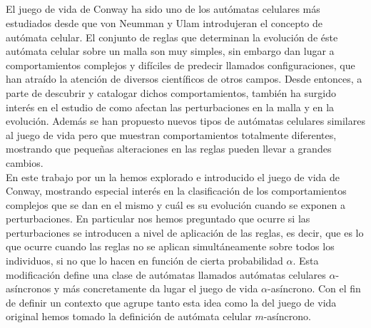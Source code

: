 \documentclass[../proyecto.tex]{memoir}
\begin{document}
\thispagestyle{empty}

\begin{center}
  {\large\bfseries \ProjectTitle}\\
\end{center}
  \begin{center}
  	
  \AuthorName\\
  \vspace{0.7cm}
  \\

  \vspace{0.7cm}
  \\
\end{center}
El juego de vida de Conway ha sido uno de los autómatas celulares más estudiados desde que von Neumman y Ulam introdujeran el concepto de autómata celular. El conjunto de reglas que determinan la evolución de éste autómata celular sobre un malla son muy simples, sin embargo dan lugar a comportamientos complejos y difíciles de predecir llamados configuraciones, que han atraído la atención de diversos científicos de otros campos. Desde entonces, a parte de descubrir y catalogar dichos comportamientos, también ha surgido interés en el estudio de como afectan las perturbaciones en la malla y en la evolución. Además se han propuesto nuevos tipos de autómatas celulares similares al juego de vida pero que muestran comportamientos totalmente diferentes, mostrando que pequeñas alteraciones en las reglas pueden llevar a grandes cambios. \\

En este trabajo por un la hemos explorado e introducido el juego de vida de Conway, mostrando especial interés en la clasificación de los comportamientos complejos que se dan en el mismo y cuál es su evolución cuando se exponen a perturbaciones. En particular nos hemos preguntado que ocurre si las perturbaciones se introducen a nivel de aplicación de las reglas, es decir, que es lo que ocurre cuando las reglas no se aplican simultáneamente sobre todos los individuos, si no que lo hacen en función de cierta probabilidad $\alpha$. Esta modificación define una clase de autómatas llamados autómatas celulares $\alpha$-asíncronos y más concretamente da lugar el juego de vida $\alpha$-asíncrono. Con el fin de definir un contexto que agrupe tanto esta idea como la del juego de vida original hemos tomado la definición de autómata celular $m$-asíncrono. \\
\end{document}
